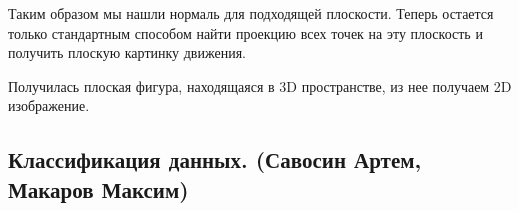 Таким образом мы нашли нормаль для подходящей плоскости. Теперь остается только стандартным способом найти проекцию всех точек на эту плоскость и получить плоскую картинку движения.
\begin{figure}[H]
\end{figure}
Получилась плоская фигура, находящаяся в 3D пространстве, из нее получаем 2D изображение.
\begin{figure}[H]
\end{figure}
\subsection{Классификация данных. (Савосин Артем, Макаров Максим)}

